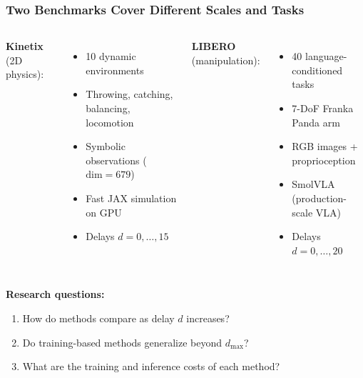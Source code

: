 \documentclass[aspectratio=1610]{beamer}
\begin{document}
\begin{frame}
\frametitle{Two Benchmarks Cover Different Scales and Tasks}

\begin{columns}
\textbf{Kinetix} (2D physics):
\begin{itemize}
    \item 10 dynamic environments
    \item Throwing, catching, balancing, locomotion
    \item Symbolic observations ($\text{dim} = 679$)
    \item Fast JAX simulation on GPU
    \item Delays $d = 0, \ldots, 15$
\end{itemize}

\textbf{LIBERO} (manipulation):
\begin{itemize}
    \item 40 language-conditioned tasks
    \item 7-DoF Franka Panda arm
    \item RGB images + proprioception
    \item SmolVLA (production-scale VLA)
    \item Delays $d = 0, \ldots, 20$
\end{itemize}
\end{columns}

\vspace{0.5em}
\textbf{Research questions:}
\begin{enumerate}
    \item[\textbf{RQ1}] How do methods compare as delay $d$ increases?
    \item[\textbf{RQ2}] Do training-based methods generalize beyond $d_{\max}$?
    \item[\textbf{RQ3}] What are the training and inference costs of each method?
\end{enumerate}

\end{frame}
\end{document}
